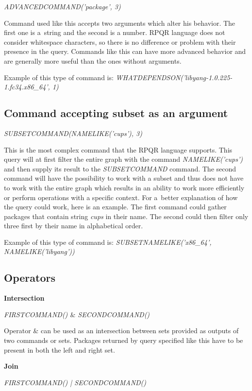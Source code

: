 \textit{ADVANCEDCOMMAND('package', 3)}

Command used like this accepts two arguments which alter his behavior. The first one is a~string
and the second is a number. RPQR language does not consider whitespace characters, so there is no
difference or problem with their presence in the query. Commands like this can have more advanced
behavior and are generally more useful than the ones without arguments.

Example of this type of command is: \textit{WHATDEPENDSON('libyang-1.0.225-1.fc34.x86\_64', 1)}

\subsection*{Command accepting subset as an argument}

\textit{SUBSETCOMMAND(NAMELIKE('cups'), 3)}

This is the most complex command that the RPQR language supports. This query will at first filter the
entire graph with the command \textit{NAMELIKE('cups')} and then supply its result to the \textit{SUBSETCOMMAND}
command. The second command will have the possibility to work with a subset and thus does not have to
work with the entire graph which results in an ability to work more efficiently or perform operations
with a specific context. For a~better explanation of how the query could work, here is an example.
The first command could gather packages that contain string \textit{cups} in their name. The second
could then filter only three first by their name in alphabetical order.

Example of this type of command is: \textit{SUBSETNAMELIKE('x86\_64', NAMELIKE('libyang'))}

\newpage

\subsection*{Operators}

\textbf{Intersection}

\textit{FIRSTCOMMAND() $\&$ SECONDCOMMAND()}

Operator \& can be used as an intersection between sets provided as outputs of two commands or sets.
Packages returned by query specified like this have to be present in both the left and right set.

\textbf{Join}

\textit{FIRSTCOMMAND() | SECONDCOMMAND()}

